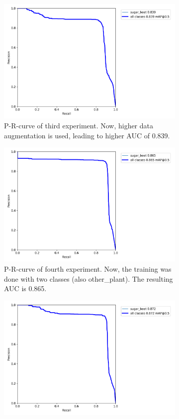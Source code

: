 \begin{figure}[htb!]
\begin{subfigure}{.5\textwidth}
		\includegraphics[scale=0.08]{figures/no_pre_high_dat.png}
		\caption{P-R-curve of third experiment. Now, higher data augmentation is used, leading to higher AUC of 0.839.}
		\label{fig:AUC_3}
	\end{subfigure}
	\begin{subfigure}{.5\textwidth}
		\centering
		\includegraphics[scale=0.08]{figures/yes_pre_low_dat.png}
		\caption{P-R-curve of fourth experiment. Now, the training was done with two classes (also other\_plant). The resulting AUC is 0.865.}
		\label{fig:AUC_4}
	\end{subfigure}
	\begin{subfigure}{1\textwidth}
		\centering
		\includegraphics[scale=0.08]{figures/yes_pre_high_dat.png}

\end{subfigure}
\end{figure}
